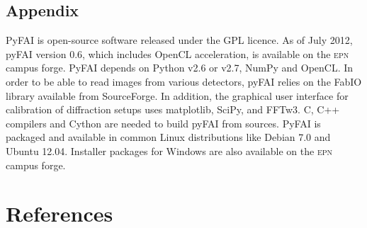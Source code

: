 \documentclass[a4paper]{jpconf}
\begin{document}
\subsection*{Appendix}
PyFAI is open-source software released under the GPL licence.
As of July 2012, pyFAI version 0.6, which includes OpenCL
acceleration, is available on the \textsc{epn} campus forge\cite{forge}.
PyFAI depends on Python v2.6 or v2.7, NumPy\cite{numpy} and OpenCL\cite{opencl}.
In order to be able to read images from various detectors, pyFAI relies on the
FabIO\cite{fabio} library available from SourceForge.  
In addition, the graphical user interface for calibration of diffraction setups
uses matplotlib\cite{matplotlib}, SciPy\cite{scipy}, and FFTw3\cite{fftw}.
C, C++ compilers and Cython\cite{cython} are needed to build pyFAI from
sources.
PyFAI is packaged and available in common Linux distributions like Debian
7.0 and Ubuntu 12.04. Installer packages for Windows are also
available on the \textsc{epn} campus forge.

\section*{References}


\end{document}
